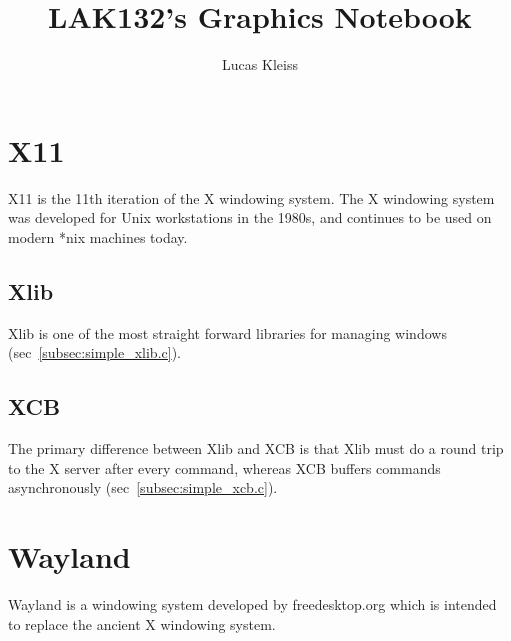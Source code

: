 \documentclass{article}
\title{LAK132's Graphics Notebook}
\author{Lucas Kleiss}
\begin{document}
\maketitle

\tableofcontents


\section{X11}
\label{sec:x11}

X11 is the 11th iteration of the X windowing system.
The X windowing system was developed for Unix workstations in the 1980s,
and continues to be used on modern *nix machines today.

\subsection{Xlib}
\label{subsec:xlib}

Xlib is one of the most straight forward libraries for managing windows
(sec~\ref{subsec:simple_xlib.c}).

\subsection{XCB}
\label{subsec:xcb}

The primary difference between Xlib and XCB is that Xlib must do a round trip
to the X server after every command,
whereas XCB buffers commands asynchronously (sec~\ref{subsec:simple_xcb.c}).


\section{Wayland}
\label{sec:wayland}

Wayland is a windowing system developed by freedesktop.org which is intended to
replace the ancient X windowing system.

\end{document}
